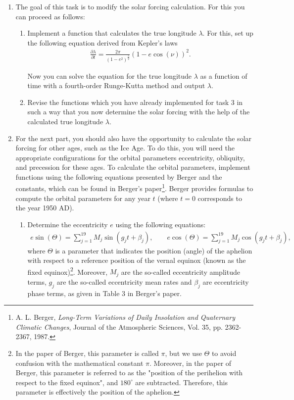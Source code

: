 \documentclass[10pt]{scrartcl}
\begin{document}
\begin{enumerate}
\item[1.] The goal of this task is to modify the solar forcing calculation. For this you can proceed as follows:

\begin{enumerate}
\item[a.] Implement a function that calculates the true longitude $\lambda$. For this, set up the following equation derived from Kepler's laws
\begin{align*}
\frac{\partial\lambda}{\partial t} = \frac{2\pi}{(1-e^2)^{\frac{3}{2}}}(1-e\cos(\nu))^2.
\end{align*}

Now you can solve the equation for the true longitude $\lambda$ as a function of time with a fourth-order Runge-Kutta method and output $\lambda$.

\item[b.] Revise the functions which you have already implemented for task 3 in such a way that you now determine the solar forcing with the help of the calculated true longitude $\lambda$.
\end{enumerate}


\item[2.] For the next part, you should also have the opportunity to calculate the solar forcing for other ages, such as the Ice Age. To do this, you will need the appropriate configurations for the orbital parameters eccentricity, obliquity, and precession for these ages. To calculate the orbital parameters, implement functions using the following equations presented by Berger and the constants, which can be found in Berger's paper\footnote{A. L. Berger, {\em Long-Term Variations of Daily Insolation and Quaternary Climatic Changes}, Journal of the Atmospheric Sciences, Vol. 35, pp. 2362-2367, 1987.}.
Berger provides formulas to compute the orbital parameters for any year $t$ (where $t=0$ corresponds to the year 1950 AD).

\begin{enumerate}
\item[a.] Determine the eccentricity $e$ using the following equations:
\begin{align}
e \sin (\Theta)=\sum_{j=1}^{19}M_j \sin (g_j t+\beta_j),
\qquad
e \cos (\Theta)=\sum_{j=1}^{19}M_j \cos (g_j t+\beta_j),
\label{eq1}
\end{align}
where $\Theta$ is a parameter that indicates the position (angle) of the aphelion with respect to a reference position of the vernal equinox (known as the fixed equinox)\footnote{In the paper of Berger, this parameter is called $\pi$, but we use $\Theta$ to avoid confusion with the mathematical constant $\pi$. Moreover, in the paper of Berger, this parameter is referred to as the "position of the perihelion with respect to the fixed equinox", and $180^{\circ}$ are subtracted. Therefore, this parameter is effectively the position of the aphelion.}.
Moreover, $M_j$ are the so-called eccentricity amplitude terms, $g_j$ are the so-called eccentricity mean rates and $\beta_j$ are eccentricity phase terms, as given in Table 3 in Berger's paper.


\end{enumerate}
\end{enumerate}
\end{document}
